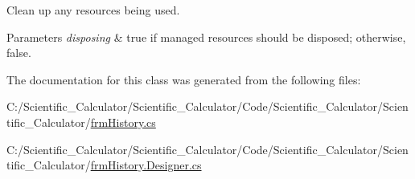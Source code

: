 Clean up any resources being used. 


\begin{DoxyParams}{Parameters}
{\em disposing} & true if managed resources should be disposed; otherwise, false.\\
\hline
\end{DoxyParams}


The documentation for this class was generated from the following files\+:\begin{DoxyCompactItemize}
\item 
C\+:/\+Scientific\+\_\+\+Calculator/\+Scientific\+\_\+\+Calculator/\+Code/\+Scientific\+\_\+\+Calculator/\+Scientific\+\_\+\+Calculator/\hyperlink{frm_history_8cs}{frm\+History.\+cs}\item 
C\+:/\+Scientific\+\_\+\+Calculator/\+Scientific\+\_\+\+Calculator/\+Code/\+Scientific\+\_\+\+Calculator/\+Scientific\+\_\+\+Calculator/\hyperlink{frm_history_8_designer_8cs}{frm\+History.\+Designer.\+cs}\end{DoxyCompactItemize}
